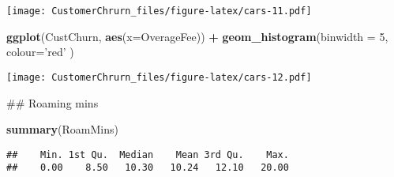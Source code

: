 \documentclass[]{article}
\newenvironment{Shaded}{\begin{snugshade}}{\end{snugshade}}
\newcommand{\KeywordTok}[1]{\textcolor[rgb]{0.13,0.29,0.53}{\textbf{#1}}}
\newcommand{\DataTypeTok}[1]{\textcolor[rgb]{0.13,0.29,0.53}{#1}}
\newcommand{\DecValTok}[1]{\textcolor[rgb]{0.00,0.00,0.81}{#1}}
\newcommand{\StringTok}[1]{\textcolor[rgb]{0.31,0.60,0.02}{#1}}
\newcommand{\OperatorTok}[1]{\textcolor[rgb]{0.81,0.36,0.00}{\textbf{#1}}}
\newcommand{\NormalTok}[1]{#1}
\begin{document}
\texttt{[image: CustomerChrurn\_files/figure-latex/cars-11.pdf]}

\begin{Shaded}
\begin{Highlighting}[]
\KeywordTok{ggplot}\NormalTok{(CustChurn, }\KeywordTok{aes}\NormalTok{(}\DataTypeTok{x=}\NormalTok{OverageFee)) }\OperatorTok{+}
\StringTok{  }\KeywordTok{geom_histogram}\NormalTok{(}\DataTypeTok{binwidth =} \DecValTok{5}\NormalTok{, }\DataTypeTok{colour=}\StringTok{'red'}\NormalTok{ )}
\end{Highlighting}
\end{Shaded}

\texttt{[image: CustomerChrurn\_files/figure-latex/cars-12.pdf]}

\begin{Shaded}
\begin{Highlighting}[]
\NormalTok{## Roaming mins }


\KeywordTok{summary}\NormalTok{(RoamMins)}
\end{Highlighting}
\end{Shaded}

\begin{verbatim}
##    Min. 1st Qu.  Median    Mean 3rd Qu.    Max. 
##    0.00    8.50   10.30   10.24   12.10   20.00
\end{verbatim}

\begin{Shaded}
\end{Shaded}
\end{document}
